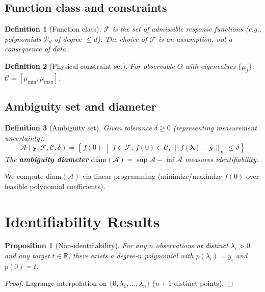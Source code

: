\documentclass[aps,pra,twocolumn,superscriptaddress]{revtex4-2}
\newtheorem{proposition}{Proposition}
\newtheorem{definition}{Definition}
\begin{document}
\subsection{Function class and constraints}

\begin{definition}[Function class]
$\mathcal{F}$ is the set of admissible response functions (e.g., polynomials $\mathcal{P}_d$ of degree $\leq d$).
The choice of $\mathcal{F}$ is an assumption, not a consequence of data.
\end{definition}

\begin{definition}[Physical constraint set]
For observable $O$ with eigenvalues $\{\mu_j\}$: $\mathcal{C} = [\mu_{\min}, \mu_{\max}]$.
\end{definition}

\subsection{Ambiguity set and diameter}

\begin{definition}[Ambiguity set]
Given tolerance $\delta \geq 0$ (representing measurement uncertainty):
\begin{equation}
\mathcal{A}(\mathbf{y}, \mathcal{F}, \mathcal{C}, \delta) = \left\{ f(0) \;\middle|\; f \in \mathcal{F},\, f(0) \in \mathcal{C},\, \|f(\boldsymbol{\lambda}) - \mathbf{y}\|_\infty \leq \delta \right\}
\end{equation}
The \textbf{ambiguity diameter} $\mathrm{diam}(\mathcal{A}) = \sup\mathcal{A} - \inf\mathcal{A}$ measures identifiability.
\end{definition}

We compute $\mathrm{diam}(\mathcal{A})$ via linear programming (minimize/maximize $f(0)$ over feasible polynomial coefficients).

\section{Identifiability Results}
\label{sec:nonident}

\begin{proposition}[Non-identifiability]
\label{prop:nonident}
For any $n$ observations at distinct $\lambda_i > 0$ and any target $t \in \mathbb{R}$, there exists a degree-$n$ polynomial with $p(\lambda_i) = y_i$ and $p(0) = t$.
\end{proposition}
\begin{proof}
Lagrange interpolation on $\{0, \lambda_1, \ldots, \lambda_n\}$ ($n+1$ distinct points).
\end{proof}
\end{document}
